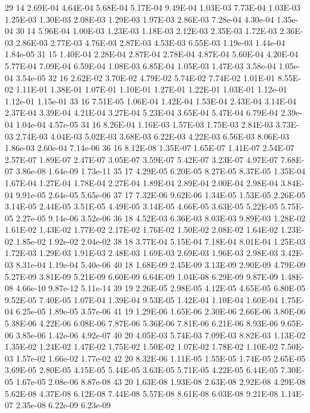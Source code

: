 29 14 	2.69E-04	4.64E-04	5.68E-04	5.17E-04	9.49E-04	1.03E-03	7.73E-04	1.03E-03	1.25E-03	1.30E-03	2.08E-03	1.29E-03	1.97E-03	2.86E-03	7.28e-04	4.30e-04	1.35e-04
30 14 	5.96E-04	1.00E-03	1.23E-03	1.18E-03	2.12E-03	2.35E-03	1.72E-03	2.36E-03	2.86E-03	2.77E-03	4.76E-03	2.87E-03	4.53E-03	6.55E-03	1.19e-03	1.44e-04	1.84e-05
31 15  	1.40E-04	2.28E-04	2.87E-04	2.78E-04	4.87E-04	5.60E-04	4.20E-04	5.77E-04	7.09E-04	6.59E-04	1.08E-03	6.85E-04	1.05E-03	1.47E-03	3.58e-04	1.05e-04	3.54e-05
32 16  	2.62E-02	3.70E-02	4.79E-02	5.74E-02	7.74E-02	1.01E-01	8.55E-02	1.11E-01	1.38E-01	1.07E-01	1.10E-01	1.27E-01	1.22E-01	1.03E-01	1.12e-01	1.12e-01	1.15e-01
33 16  	7.51E-05	1.06E-04	1.42E-04	1.53E-04	2.43E-04	3.14E-04	2.37E-04	3.39E-04	4.21E-04	3.27E-04	5.23E-04	3.65E-04	5.47E-04	6.79E-04	2.39e-04	1.04e-04	4.57e-05
34 16  	8.26E-04	1.16E-03	1.57E-03	1.75E-03	2.84E-03	3.73E-03	2.74E-03	4.04E-03	5.02E-03	3.68E-03	6.22E-03	4.22E-03	6.56E-03	8.06E-03	1.86e-03	2.60e-04	7.14e-06
36 16  	8.12E-08	1.35E-07	1.65E-07	1.41E-07	2.54E-07	2.57E-07	1.89E-07	2.47E-07	3.05E-07	3.59E-07	5.42E-07	3.23E-07	4.97E-07	7.68E-07	3.86e-08	1.64e-09	1.73e-11
35 17 	4.29E-05	6.20E-05	8.27E-05	8.37E-05	1.35E-04	1.67E-04	1.27E-04	1.78E-04	2.27E-04	1.89E-04	2.89E-04	2.00E-04	2.98E-04	3.84E-04	9.91e-05	2.64e-05	5.65e-06
37 17 	7.32E-06	9.62E-06	1.34E-05	1.53E-05	2.26E-05	3.14E-05	2.44E-05	3.51E-05	4.49E-05	3.14E-05	4.66E-05	3.63E-05	5.22E-05	5.75E-05	2.27e-05	9.14e-06	3.52e-06
36 18 	4.52E-03	6.36E-03	8.03E-03	9.89E-03	1.28E-02	1.61E-02	1.43E-02	1.77E-02	2.17E-02	1.76E-02	1.50E-02	2.08E-02	1.64E-02	1.23E-02	1.85e-02	1.92e-02	2.04e-02
38 18 	3.77E-04	5.15E-04	7.18E-04	8.01E-04	1.25E-03	1.72E-03	1.29E-03	1.91E-03	2.48E-03	1.69E-03	2.69E-03	1.96E-03	2.98E-03	3.42E-03	8.31e-04	1.19e-04	5.40e-06
40 18 	1.68E-09	2.45E-09	3.13E-09	2.90E-09	4.79E-09	5.27E-09	3.81E-09	5.21E-09	6.60E-09	6.64E-09	1.04E-08	6.29E-09	9.87E-09	1.48E-08	4.66e-10	9.87e-12	5.11e-14
39 19  	2.26E-05	2.98E-05	4.12E-05	4.65E-05	6.80E-05	9.52E-05	7.40E-05	1.07E-04	1.39E-04	9.53E-05	1.42E-04	1.10E-04	1.60E-04	1.75E-04	6.25e-05	1.89e-05	3.57e-06
41 19  	1.29E-06	1.65E-06	2.30E-06	2.66E-06	3.80E-06	5.38E-06	4.22E-06	6.08E-06	7.87E-06	5.36E-06	7.81E-06	6.21E-06	8.93E-06	9.65E-06	3.85e-06	1.42e-06	4.92e-07
40 20 	4.05E-03	5.74E-03	7.09E-03	8.82E-03	1.13E-02	1.35E-02	1.24E-02	1.47E-02	1.75E-02	1.50E-02	1.07E-02	1.78E-02	1.10E-02	7.50E-03	1.57e-02	1.66e-02	1.77e-02
42 20 	8.32E-06	1.11E-05	1.55E-05	1.74E-05	2.65E-05	3.69E-05	2.80E-05	4.15E-05	5.44E-05	3.63E-05	5.71E-05	4.22E-05	6.44E-05	7.30E-05	1.67e-05	2.08e-06	8.87e-08
43 20 	1.63E-08	1.93E-08	2.63E-08	2.92E-08	4.29E-08	5.62E-08	4.37E-08	6.12E-08	7.44E-08	5.57E-08	8.61E-08	6.03E-08	9.21E-08	1.14E-07	2.35e-08	6.22e-09	6.23e-09
